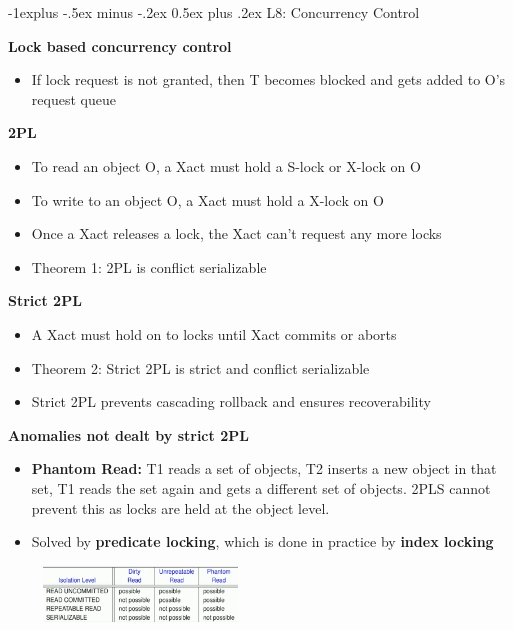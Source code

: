 \documentclass[10pt, landscape]{article}
\makeatletter
\renewcommand{\subsection}{\@startsection{subsection}{2}{0mm}%
                                {-1explus -.5ex minus -.2ex}%
                                {0.5ex plus .2ex}%
                                {\normalfont\normalsize\bfseries}}
\makeatother
\begin{document}
\begin{multicols}{4}
\subsection{L8: Concurrency Control}

\textbf{Lock based concurrency control} \\ 
\begin{itemize}
  \item If lock request is not granted, then T becomes blocked and gets added to O's request queue
\end{itemize}

\textbf{2PL} \\
\begin{itemize} 
  \item To read an object O, a Xact must hold a S-lock or X-lock on O 
  \item To write to an object O, a Xact must hold a X-lock on O 
  \item Once a Xact releases a lock, the Xact can't request any more locks
  \item Theorem 1: 2PL is conflict serializable
\end{itemize}

\textbf{Strict 2PL} \\
\begin{itemize}
  \item A Xact must hold on to locks until Xact commits or aborts
  \item Theorem 2: Strict 2PL is strict and conflict serializable
  \item Strict 2PL prevents cascading rollback and ensures recoverability
\end{itemize}

\textbf{Anomalies not dealt by strict 2PL} \\
\begin{itemize}
  \item \textbf{Phantom Read:} T1 reads a set of objects, T2 inserts a new object in that set, T1 reads the set again and gets a different set of objects. 2PLS cannot prevent this as locks are held at the object level.
  \item Solved by \textbf{predicate locking}, which is done in practice by \textbf{index locking}
\end{itemize}
\includegraphics[width=7cm, height =1.5cm]{ansi_iso.png}


\end{multicols}
\end{document}
